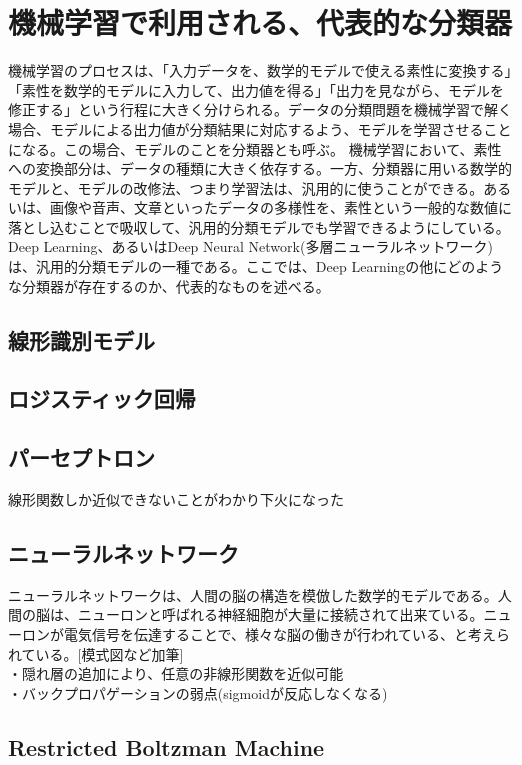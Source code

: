 \section{機械学習で利用される、代表的な分類器}
機械学習のプロセスは、「入力データを、数学的モデルで使える素性に変換する」「素性を数学的モデルに入力して、出力値を得る」「出力を見ながら、モデルを修正する」という行程に大きく分けられる。データの分類問題を機械学習で解く場合、モデルによる出力値が分類結果に対応するよう、モデルを学習させることになる。この場合、モデルのことを分類器とも呼ぶ。
機械学習において、素性への変換部分は、データの種類に大きく依存する。一方、分類器に用いる数学的モデルと、モデルの改修法、つまり学習法は、汎用的に使うことができる。あるいは、画像や音声、文章といったデータの多様性を、素性という一般的な数値に落とし込むことで吸収して、汎用的分類モデルでも学習できるようにしている。
Deep Learning、あるいはDeep Neural Network(多層ニューラルネットワーク)は、汎用的分類モデルの一種である。ここでは、Deep Learningの他にどのような分類器が存在するのか、代表的なものを述べる。
\subsection{線形識別モデル}

\subsection{ロジスティック回帰}

\subsection{パーセプトロン}
線形関数しか近似できないことがわかり下火になった

\subsection{ニューラルネットワーク}
ニューラルネットワークは、人間の脳の構造を模倣した数学的モデルである。人間の脳は、ニューロンと呼ばれる神経細胞が大量に接続されて出来ている。ニューロンが電気信号を伝達することで、様々な脳の働きが行われている、と考えられている。[模式図など加筆]\\
・隠れ層の追加により、任意の非線形関数を近似可能\\
・バックプロパゲーションの弱点(sigmoidが反応しなくなる)

\subsection{Restricted Boltzman Machine}

